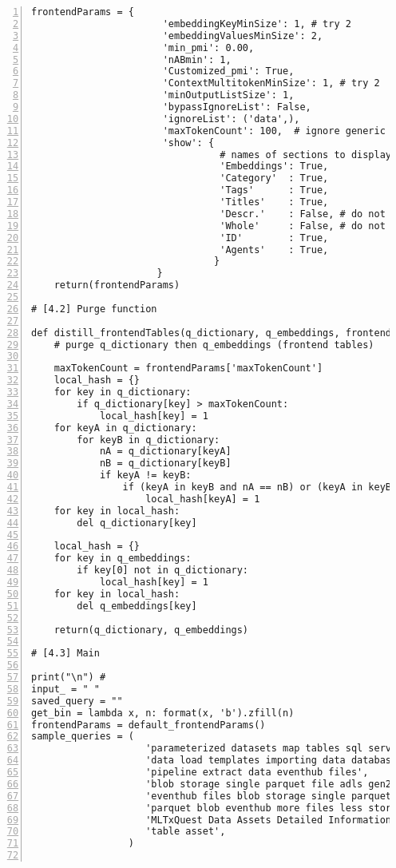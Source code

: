 \documentclass[10pt]{article}
\begin{document}
{\begin{lstlisting}[numbers=left,basicstyle=\ttfamily\footnotesize]
    frontendParams = {
                       'embeddingKeyMinSize': 1, # try 2 
                       'embeddingValuesMinSize': 2,
                       'min_pmi': 0.00,
                       'nABmin': 1,
                       'Customized_pmi': True,
                       'ContextMultitokenMinSize': 1, # try 2
                       'minOutputListSize': 1,
                       'bypassIgnoreList': False,
                       'ignoreList': ('data',),
                       'maxTokenCount': 100,  # ignore generic tokens if large enough 
                       'show': { 
                                 # names of sections to display in output results
                                 'Embeddings': True,
                                 'Category'  : True, 
                                 'Tags'      : True,
                                 'Titles'    : True,
                                 'Descr.'    : False, # do not built to save space
                                 'Whole'     : False, # do not build to save space
                                 'ID'        : True,
                                 'Agents'    : True,
                                }
                      }
    return(frontendParams)

# [4.2] Purge function 

def distill_frontendTables(q_dictionary, q_embeddings, frontendParams):
    # purge q_dictionary then q_embeddings (frontend tables) 
    
    maxTokenCount = frontendParams['maxTokenCount']
    local_hash = {}    
    for key in q_dictionary:
        if q_dictionary[key] > maxTokenCount:
            local_hash[key] = 1
    for keyA in q_dictionary:
        for keyB in q_dictionary:
            nA = q_dictionary[keyA]
            nB = q_dictionary[keyB]
            if keyA != keyB:
                if (keyA in keyB and nA == nB) or (keyA in keyB.split('~')):
                    local_hash[keyA] = 1
    for key in local_hash:
        del q_dictionary[key]  

    local_hash = {}    
    for key in q_embeddings: 
        if key[0] not in q_dictionary:
            local_hash[key] = 1
    for key in local_hash:
        del q_embeddings[key] 
  
    return(q_dictionary, q_embeddings)

# [4.3] Main

print("\n") #
input_ = " "
saved_query = ""
get_bin = lambda x, n: format(x, 'b').zfill(n)
frontendParams = default_frontendParams()
sample_queries = (
                    'parameterized datasets map tables sql server',
                    'data load templates importing data database data warehouse',
                    'pipeline extract data eventhub files',
                    'blob storage single parquet file adls gen2',
                    'eventhub files blob storage single parquet',
                    'parquet blob eventhub more files less storage single table',
                    'MLTxQuest Data Assets Detailed Information page',
                    'table asset',
                 ) 


\end{lstlisting}}
\end{document}
